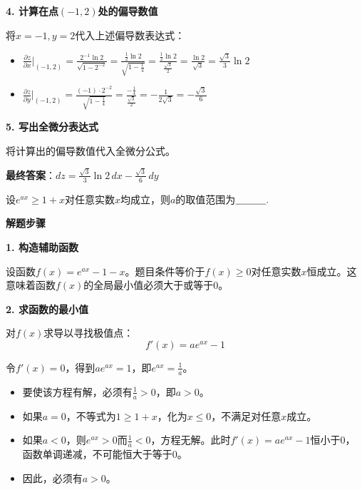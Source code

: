 \documentclass[standard]{ExBook}
\begin{document}
\begin{qitems}
\begin{bbox}
\begin{solution}
            \textbf{4. 计算在点$(-1,2)$处的偏导数值}
            
            将$x=-1, y=2$代入上述偏导数表达式：
            \begin{itemize}
                \item $\frac{\partial z}{\partial x}|_{(-1,2)} = \frac{2^{-1}\ln 2}{\sqrt{1-2^{-2}}} = \frac{\frac{1}{2}\ln 2}{\sqrt{1-\frac{1}{4}}} = \frac{\frac{1}{2}\ln 2}{\frac{\sqrt{3}}{2}} = \frac{\ln 2}{\sqrt{3}} = \frac{\sqrt{3}}{3}\ln 2$
                \item $\frac{\partial z}{\partial y}|_{(-1,2)} = \frac{(-1) \cdot 2^{-2}}{\sqrt{1-\frac{1}{4}}} = \frac{-\frac{1}{4}}{\frac{\sqrt{3}}{2}} = -\frac{1}{2\sqrt{3}} = -\frac{\sqrt{3}}{6}$
            \end{itemize}
            
            \textbf{5. 写出全微分表达式}
            
            将计算出的偏导数值代入全微分公式。
            
            \textbf{最终答案}：$dz = \frac{\sqrt{3}}{3}\ln 2\, dx - \frac{\sqrt{3}}{6}\, dy$
        \end{solution}
    \end{bbox}

    \begin{bbox}
        \qitem 设$e^{ax}\ge 1+x$对任意实数$x$均成立，则$a$的取值范围为$\underline{\hspace{3em}}.$
        \begin{solution}
            \textbf{解题步骤}
            
            \textbf{1. 构造辅助函数}
            
            设函数$f(x) = e^{ax} - 1 - x$。题目条件等价于$f(x)\ge 0$对任意实数$x$恒成立。这意味着函数$f(x)$的全局最小值必须大于或等于$0$。
            
            \textbf{2. 求函数的最小值}
            
            对$f(x)$求导以寻找极值点：
            $$f'(x) = ae^{ax} - 1$$
            
            令$f'(x)=0$，得到$ae^{ax}=1$，即$e^{ax}=\frac{1}{a}$。
            \begin{itemize}
                \item 要使该方程有解，必须有$\frac{1}{a}>0$，即$a>0$。
                \item 如果$a=0$，不等式为$1\ge 1+x$，化为$x\le 0$，不满足对任意$x$成立。
                \item 如果$a<0$，则$e^{ax}>0$而$\frac{1}{a}<0$，方程无解。此时$f'(x)=ae^{ax}-1$恒小于0，函数单调递减，不可能恒大于等于0。
                \item 因此，必须有$a>0$。
            \end{itemize}
            

\end{solution}
\end{bbox}
\end{qitems}
\end{document}
